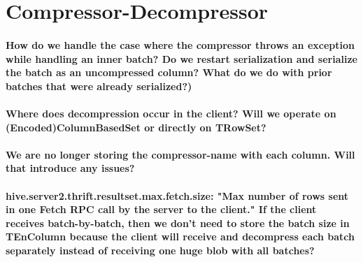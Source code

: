 \documentclass[11pt,a4paper]{article}
\begin{document}
\section{Compressor-Decompressor}
	\paragraph{How do we handle the case where the compressor throws an exception while handling an inner batch? Do we restart serialization and serialize the batch as an uncompressed column? What do we do with prior batches that were already serialized?)}
	
	\paragraph{Where does decompression occur in the client? Will we operate on (Encoded)ColumnBasedSet or directly on TRowSet?}
	
	\paragraph{We are no longer storing the compressor-name with each column. Will that introduce any issues?}
	
	\paragraph{hive.server2.thrift.resultset.max.fetch.size: "Max number of rows sent in one Fetch RPC call by the server to the client." If the client receives batch-by-batch, then we don't need to store the batch size in TEnColumn because the client will receive and decompress each batch separately instead of receiving one huge blob with all batches?}
\end{document}
